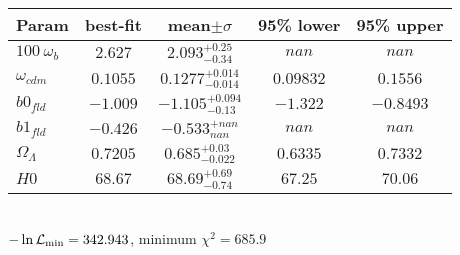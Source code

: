 \begin{tabular}{|l|c|c|c|c|} 
 \hline 
Param & best-fit & mean$\pm\sigma$ & 95\% lower & 95\% upper \\ \hline 
$100~\omega_{b }$ &$2.627$ & $2.093_{-0.34}^{+0.25}$ & $nan$ & $nan$ \\ 
$\omega_{cdm }$ &$0.1055$ & $0.1277_{-0.014}^{+0.014}$ & $0.09832$ & $0.1556$ \\ 
$b0_{fld }$ &$-1.009$ & $-1.105_{-0.13}^{+0.094}$ & $-1.322$ & $-0.8493$ \\ 
$b1_{fld }$ &$-0.426$ & $-0.533_{nan}^{+nan}$ & $nan$ & $nan$ \\ 
$\Omega_{\Lambda }$ &$0.7205$ & $0.685_{-0.022}^{+0.03}$ & $0.6335$ & $0.7332$ \\ 
$H0$ &$68.67$ & $68.69_{-0.74}^{+0.69}$ & $67.25$ & $70.06$ \\ 
\hline 
 \end{tabular} \\ 
$-\ln{\cal L}_\mathrm{min} =342.943$, minimum $\chi^2=685.9$ \\ 
